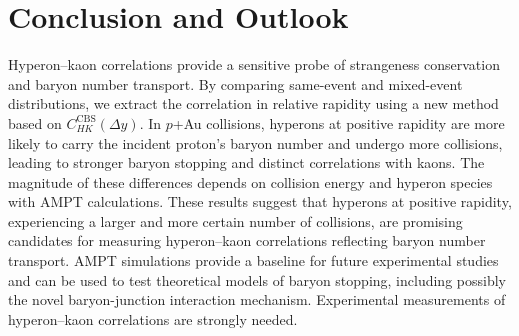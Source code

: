 \documentclass[a4paper,12pt]{article}
\begin{document}
\section{Conclusion and Outlook}

Hyperon–kaon correlations provide a sensitive probe of strangeness conservation and baryon number transport. By comparing same-event and mixed-event distributions, we extract the correlation in relative rapidity using a new method based on $C^{\text{CBS}}_{HK}(\Delta y)$.
In $p$+Au collisions, hyperons at positive rapidity are more likely to carry the incident proton's baryon number and undergo more collisions, leading to stronger baryon stopping and distinct correlations with kaons. The magnitude of these differences depends on collision energy and hyperon species with AMPT calculations.
These results suggest that hyperons at positive rapidity, experiencing a larger and more certain number of collisions, are promising candidates for measuring hyperon–kaon correlations reflecting baryon number transport. AMPT simulations provide a baseline for future experimental studies and can be used to test theoretical models of baryon stopping, including possibly the novel baryon-junction interaction mechanism.
Experimental measurements of hyperon–kaon correlations are strongly needed.


\end{document}
